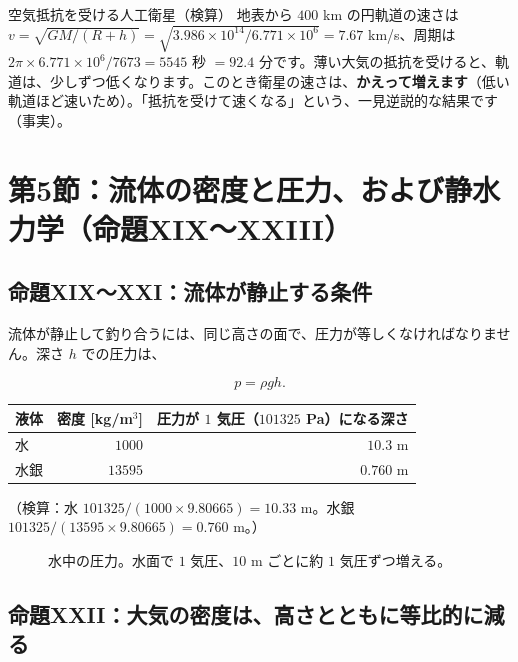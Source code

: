 \documentclass[a4paper,11pt,openany]{ltjsbook}
\begin{document}
\begin{examplebox}{空気抵抗を受ける人工衛星（検算）}
地表から $400$ km の円軌道の速さは $v=\sqrt{GM/(R+h)}=\sqrt{3.986\times10^{14}/6.771\times10^6}=7.67$ km/s、周期は $2\pi\times6.771\times10^6/7673=5545$ 秒 $=92.4$ 分です。薄い大気の抵抗を受けると、軌道は、少しずつ低くなります。このとき衛星の速さは、\textbf{かえって増えます}（低い軌道ほど速いため）。「抵抗を受けて速くなる」という、一見逆説的な結果です（事実）。
\end{examplebox}

\section{第5節：流体の密度と圧力、および静水力学（命題XIX〜XXIII）}

\subsection{命題XIX〜XXI：流体が静止する条件}

流体が静止して釣り合うには、同じ高さの面で、圧力が等しくなければなりません。深さ $h$ での圧力は、

\[
p=\rho gh.
\]

\begin{center}
\begin{tabular}{lrr}
\toprule
液体 & 密度 [kg/m$^3$] & 圧力が $1$ 気圧（$101325$ Pa）になる深さ\\
\midrule
水 & $1000$ & $10.3$ m\\
水銀 & $13595$ & $0.760$ m\\
\bottomrule
\end{tabular}
\end{center}

（検算：水 $101325/(1000\times9.80665)=10.33$ m。水銀 $101325/(13595\times9.80665)=0.760$ m。）

\begin{figure}[htbp]
\centering
{}
\caption{水中の圧力。水面で $1$ 気圧、$10$ m ごとに約 $1$ 気圧ずつ増える。}
\end{figure}

\subsection{命題XXII：大気の密度は、高さとともに等比的に減る}
\end{document}
